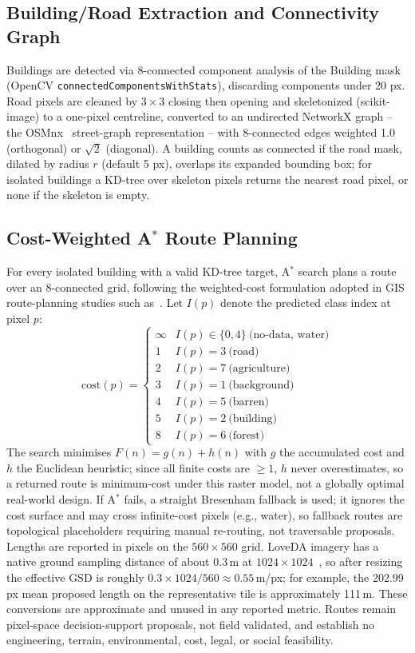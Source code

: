 \documentclass[runningheads]{llncs}
\begin{document}
\subsection{Building/Road Extraction and Connectivity Graph}
Buildings are detected via 8-connected component analysis of the Building mask (OpenCV \texttt{connectedComponentsWithStats}), discarding components under 20 px. Road pixels are cleaned by $3\times3$ closing then opening and skeletonized (scikit-image) to a one-pixel centreline, converted to an undirected NetworkX graph -- the OSMnx~\cite{boeing2017} street-graph representation -- with 8-connected edges weighted 1.0 (orthogonal) or $\sqrt2$ (diagonal). A building counts as connected if the road mask, dilated by radius $r$ (default 5 px), overlaps its expanded bounding box; for isolated buildings a KD-tree over skeleton pixels returns the nearest road pixel, or none if the skeleton is empty.

\subsection{Cost-Weighted A$^{*}$ Route Planning}
For every isolated building with a valid KD-tree target, A$^{*}$ search plans a route over an 8-connected grid, following the weighted-cost formulation adopted in GIS route-planning studies such as~\cite{wang2022astar}. Let $I(p)$ denote the predicted class index at pixel $p$:
\begin{equation}
\mathrm{cost}(p)=\begin{cases}
\infty & I(p)\in\{0,4\}\ \text{(no-data, water)}\\
1 & I(p)=3\ \text{(road)}\\
2 & I(p)=7\ \text{(agriculture)}\\
3 & I(p)=1\ \text{(background)}\\
4 & I(p)=5\ \text{(barren)}\\
5 & I(p)=2\ \text{(building)}\\
8 & I(p)=6\ \text{(forest)}
\end{cases}
\end{equation}
The search minimises $F(n)=g(n)+h(n)$ with $g$ the accumulated cost and $h$ the Euclidean heuristic; since all finite costs are $\ge1$, $h$ never overestimates, so a returned route is minimum-cost under this raster model, not a globally optimal real-world design. If A$^{*}$ fails, a straight Bresenham fallback is used; it ignores the cost surface and may cross infinite-cost pixels (e.g., water), so fallback routes are topological placeholders requiring manual re-routing, not traversable proposals. Lengths are reported in pixels on the $560\times560$ grid. LoveDA imagery has a native ground sampling distance of about $0.3$\,m at $1024\times1024$~\cite{wang2021loveda}, so after resizing the effective GSD is roughly $0.3\times1024/560\approx0.55$\,m/px; for example, the 202.99 px mean proposed length on the representative tile is approximately 111\,m. These conversions are approximate and unused in any reported metric. Routes remain pixel-space decision-support proposals, not field validated, and establish no engineering, terrain, environmental, cost, legal, or social feasibility.
\end{document}
